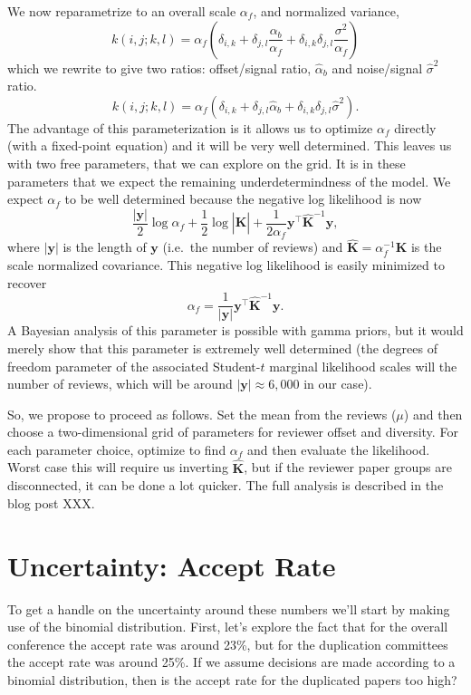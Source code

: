 We now reparametrize  to an overall scale
\(\alpha_f\), and normalized variance, \[
k(i,j; k,l) = \alpha_f\left(\delta_{i,k}  + \delta_{j,l} \frac{\alpha_b}{\alpha_f} + \delta_{i, k}\delta_{j,l} \frac{\sigma^2}{\alpha_f}\right)
\]
which we rewrite to give two ratios: offset/signal ratio,
\(\hat{\alpha}_b\) and noise/signal \(\hat{\sigma}^2\) ratio. \[
k(i,j; k,l) = \alpha_f\left(\delta_{i,k}  + \delta_{j,l} \hat{\alpha}_b + \delta_{i, k}\delta_{j,l} \hat{\sigma}^2\right).
\] 
The advantage of this parameterization is it allows us to optimize
\(\alpha_f\) directly (with a fixed-point equation) and it will be very
well determined. This leaves us with two free parameters, that we can
explore on the grid. It is in these parameters that we expect the
remaining underdetermindness of the model. We expect \(\alpha_f\) to be
well determined because the negative log likelihood is now 
\[
\frac{|\mathbf{y}|}{2}\log\alpha_f + \frac{1}{2}\log  \left|\hat{\mathbf{K}}\right| + \frac{1}{2\alpha_f}\mathbf{y}^\top \hat{\mathbf{K}}^{-1} \mathbf{y},
\]
where \(|\mathbf{y}|\) is the length of \(\mathbf{y}\) (i.e.~the
number of reviews) and \(\hat{\mathbf{K}}=\alpha_f^{-1}\mathbf{K}\) is
the scale normalized covariance. This negative log likelihood is easily
minimized to recover 
\[
\alpha_f = \frac{1}{|\mathbf{y}|} \mathbf{y}^\top \hat{\mathbf{K}}^{-1} \mathbf{y}.
\] 
A Bayesian analysis of this parameter is possible with gamma priors,
but it would merely show that this parameter is extremely well
determined (the degrees of freedom parameter of the associated
Student-\(t\) marginal likelihood scales will the number of reviews,
which will be around \(|\mathbf{y}| \approx 6,000\) in our case).

So, we propose to proceed as follows. Set the mean from the reviews
(\(\mu\)) and then choose a two-dimensional grid of parameters for
reviewer offset and diversity. For each parameter choice, optimize to
find \(\alpha_f\) and then evaluate the likelihood. Worst case this will
require us inverting \(\hat{\mathbf{K}}\), but if the reviewer paper
groups are disconnected, it can be done a lot quicker.  The full
analysis is described in the blog post XXX.

\section{Uncertainty: Accept Rate}\label{uncertainty-accept-rate}

To get a handle on the uncertainty around these numbers we'll start by
making use of the
binomial distribution.
First, let's explore the fact that for the overall conference the accept
rate was around 23\%, but for the duplication committees the accept rate
was around 25\%. If we assume decisions are made according to a binomial
distribution, then is the accept rate for the duplicated papers too
high?

